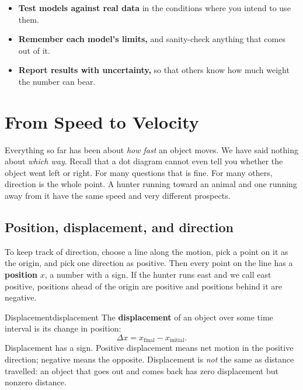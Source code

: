 \documentclass[11pt,twoside,openany]{book}
\newcounter{check}[chapter]
\begin{document}
\begin{keyidea}
\begin{itemize}[itemsep=2pt]
  \item \textbf{Test models against real data} in the conditions where you intend to use them.
  \item \textbf{Remember each model's limits,} and sanity-check anything that comes out of it.
  \item \textbf{Report results with uncertainty,} so that others know how much weight the number can bear.
\end{itemize}
\end{keyidea}

\section{From Speed to Velocity}
\label{sec:velocity}

Everything so far has been about \emph{how fast} an object moves. We have said nothing about \emph{which way}. Recall that a dot diagram cannot even tell you whether the object went left or right. For many questions that is fine. For many others, direction is the whole point. A hunter running toward an animal and one running away from it have the same speed and very different prospects.

\subsection{Position, displacement, and direction}

To keep track of direction, choose a line along the motion, pick a point on it as the origin, and pick one direction as positive. Then every point on the line has a \textbf{position} $x$, a number with a sign. If the hunter runs east and we call east positive, positions ahead of the origin are positive and positions behind it are negative.

\begin{definition}{Displacement}{displacement}
The \textbf{displacement} of an object over some time interval is its change in position:
\[
\Delta x = x_{\text{final}} - x_{\text{initial}}.
\]
Displacement has a sign. Positive displacement means net motion in the positive direction; negative means the opposite. Displacement is \emph{not} the same as distance travelled: an object that goes out and comes back has zero displacement but nonzero distance.
\end{definition}
\end{document}

